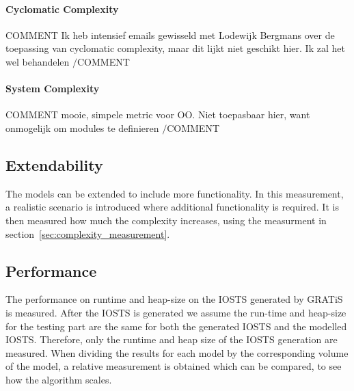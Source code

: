 \paragraph*{Cyclomatic Complexity} COMMENT Ik heb intensief emails gewisseld met Lodewijk Bergmans over de toepassing van cyclomatic complexity, maar dit lijkt niet geschikt hier. Ik zal het wel behandelen $/$COMMENT

\paragraph*{System Complexity} COMMENT mooie, simpele metric voor OO. Niet toepasbaar hier, want onmogelijk om modules te definieren $/$COMMENT

\subsection{Extendability}
The models can be extended to include more functionality. In this measurement, a realistic scenario is introduced where additional functionality is required. It is then measured how much the complexity increases, using the measurment in section~\ref{sec:complexity_measurement}.

\subsection{Performance}
The performance on runtime and heap-size on the IOSTS generated by GRATiS is measured. After the IOSTS is generated we assume the run-time and heap-size for the testing part are the same for both the generated IOSTS and the modelled IOSTS. Therefore, only the runtime and heap size of the IOSTS generation are measured. When dividing the results for each model by the corresponding volume of the model, a relative measurement is obtained which can be compared, to see how the algorithm scales.
